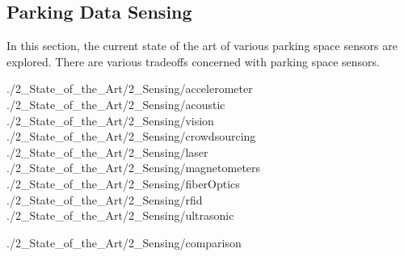 \subsection{Parking Data Sensing}
In this section, the current state of the art of various parking space sensors are explored. There are various tradeoffs concerned with parking space sensors.

{./2_State_of_the_Art/2_Sensing/accelerometer}
{./2_State_of_the_Art/2_Sensing/acoustic}
{./2_State_of_the_Art/2_Sensing/vision}
{./2_State_of_the_Art/2_Sensing/crowdsourcing}
{./2_State_of_the_Art/2_Sensing/laser}
{./2_State_of_the_Art/2_Sensing/magnetometers}
{./2_State_of_the_Art/2_Sensing/fiberOptics}
{./2_State_of_the_Art/2_Sensing/rfid}
{./2_State_of_the_Art/2_Sensing/ultrasonic}

{./2_State_of_the_Art/2_Sensing/comparison}
